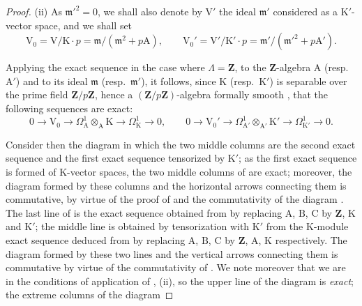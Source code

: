 \begin{proof}
(ii) As $\mathfrak{m}'^2=0$, we shall also denote by $\mathrm{V}'$ the ideal $\mathfrak{m}'$ considered as a $\mathrm{K}'$-vector space, and we shall set
\begin{equation}
\label{0.22.4.4.4}
  \mathrm{V}_0=\mathrm{V}/\mathrm{K}\cdot p=\mathfrak{m}/(\mathfrak{m}^2+p\mathrm{A}),\qquad
  \mathrm{V}_0'=\mathrm{V}'/\mathrm{K}'\cdot p=\mathfrak{m}'/(\mathfrak{m}'^2+p\mathrm{A}').
  \tag{22.4.4.4}
\end{equation}

Applying the exact sequence  in the case where $\Lambda=\mathbf{Z}$, to the $\mathbf{Z}$-algebra $\mathrm{A}$ (resp.~$\mathrm{A}'$) and to its ideal $\mathfrak{m}$ (resp.~$\mathfrak{m}'$), it follows, since $\mathrm{K}$ (resp.~$\mathrm{K}'$) is separable over the prime field $\mathbf{Z}/p\mathbf{Z}$, hence a $(\mathbf{Z}/p\mathbf{Z})$-algebra formally smooth , that the following sequences are exact:
\begin{equation}
\label{0.22.4.4.5}
  0\longrightarrow\mathrm{V}_0\longrightarrow\Omega^1_\mathrm{A}\otimes_\mathrm{A}\mathrm{K}
  \longrightarrow\Omega^1_\mathrm{K}\longrightarrow0,\qquad
  0\longrightarrow\mathrm{V}_0'\longrightarrow\Omega^1_{\mathrm{A}'}\otimes_{\mathrm{A}'}\mathrm{K}'
  \longrightarrow\Omega^1_{\mathrm{K}'}\longrightarrow0.
  \tag{22.4.4.5}
\end{equation}

Consider then the diagram  in which the two middle columns are the second exact sequence  and the first exact sequence  tensorized by $\mathrm{K}'$; as the first exact sequence  is formed of $\mathrm{K}$-vector spaces, the two middle columns of  are exact; moreover, the diagram formed by these columns and the horizontal arrows connecting them is commutative, by virtue of the proof of  and the commutativity of the diagram .
The last line of  is the exact sequence obtained from  by replacing $\mathrm{A}$, $\mathrm{B}$, $\mathrm{C}$ by $\mathbf{Z}$, $\mathrm{K}$ and $\mathrm{K}'$; the middle line is obtained by tensorization with $\mathrm{K}'$ from the $\mathrm{K}$-module exact sequence deduced from  by replacing $\mathrm{A}$, $\mathrm{B}$, $\mathrm{C}$ by $\mathbf{Z}$, $\mathrm{A}$, $\mathrm{K}$ respectively.
The diagram formed by these two lines and the vertical arrows connecting them is commutative by virtue of the commutativity of .
We note moreover that we are in the conditions of application of , (ii), so the upper line of the diagram  is \emph{exact}; the extreme columns of the diagram


\end{proof}
